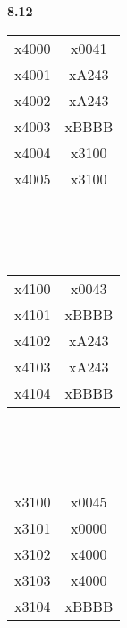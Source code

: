 \documentclass[a4paper,12pt]{article}     %
\begin{document}
~\\
~\\
\textbf{8.12}\\
\begin{minipage}{\textwidth}
  \begin{minipage}[t]{0.45\textwidth}
    \centering
    \begin{tabular}{c|c|}
      \cline{2-2}
      x4000 & x0041\\
      \cline{2-2}
      x4001 & xA243\\
      \cline{2-2}
      x4002 & xA243\\
      \cline{2-2}
      x4003 & xBBBB\\
      \cline{2-2}
      x4004 & x3100\\
      \cline{2-2}
      x4005 & x3100\\
      \cline{2-2}
    \end{tabular}\\
    ~\\
    ~\\
    \begin{tabular}{c|c|}
      \cline{2-2}
      x4100 & x0043\\
      \cline{2-2}
      x4101 & xBBBB\\
      \cline{2-2}
      x4102 & xA243\\
      \cline{2-2}
      x4103 & xA243\\
      \cline{2-2}
      x4104 & xBBBB\\
      \cline{2-2}
    \end{tabular}\\
    ~\\
    ~\\
    \begin{tabular}{c|c|}
      \cline{2-2}
      x3100 & x0045\\
      \cline{2-2}
      x3101 & x0000\\
      \cline{2-2}
      x3102 & x4000\\
      \cline{2-2}
      x3103 & x4000\\
      \cline{2-2}
      x3104 & xBBBB\\
      \cline{2-2}
    \end{tabular}\\
  \end{minipage}
  \begin{minipage}[t]{0.45\textwidth}
    \vspace{-5em}
    \centering
    \begin{tabular}{c|c|}

\end{tabular}
\end{minipage}
\end{minipage}
\end{document}
